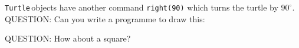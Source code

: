 \documentclass[11pt,a4paper]{scrartcl}
\newcommand{\turtle}{\texttt{Turtle}\,}
\begin{document}
\turtle objects have another command \texttt{right(90)} which turns the turtle by $90^\circ$. QUESTION: Can you write a programme to draw this:
\begin{center}
\end{center}
QUESTION: How about a square?
\begin{center}
\end{center}
\end{document}
